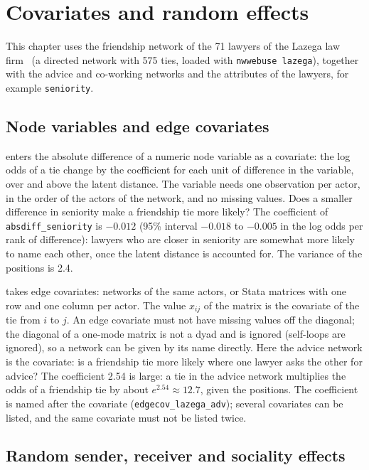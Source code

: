 \chapter{Covariates and random effects}\label{ch:effects}

This chapter uses the friendship network of the 71 lawyers of the Lazega law firm~\cite{lazega2001} (a directed network with 575 ties, loaded with \texttt{nwwebuse lazega}), together with the advice and co-working networks and the attributes of the lawyers, for example \texttt{seniority}.

\section{Node variables and edge covariates}\label{sec:covs}

 enters the absolute difference of a numeric node variable as a covariate: the log odds of a tie change by the coefficient for each unit of difference in the variable, over and above the latent distance. The variable needs one observation per actor, in the order of the actors of the network, and no missing values. Does a smaller difference in seniority make a friendship tie more likely?
The coefficient of \texttt{absdiff\_seniority} is $-0.012$ (95\% interval $-0.018$ to $-0.005$ in the log odds per rank of difference): lawyers who are closer in seniority are somewhat more likely to name each other, once the latent distance is accounted for. The variance of the positions is 2.4.

 takes edge covariates: networks of the same actors, or Stata matrices with one row and one column per actor. The value $x_{ij}$ of the matrix is the covariate of the tie from $i$ to $j$. An edge covariate must not have missing values off the diagonal; the diagonal of a one-mode matrix is not a dyad and is ignored (self-loops are ignored), so a network can be given by its name directly. Here the advice network is the covariate: is a friendship tie more likely where one lawyer asks the other for advice?
The coefficient 2.54 is large: a tie in the advice network multiplies the odds of a friendship tie by about $e^{2.54}\approx 12.7$, given the positions. The coefficient is named after the covariate (\texttt{edgecov\_lazega\_adv}); several covariates can be listed, and the same covariate must not be listed twice.

\section{Random sender, receiver and sociality effects}

